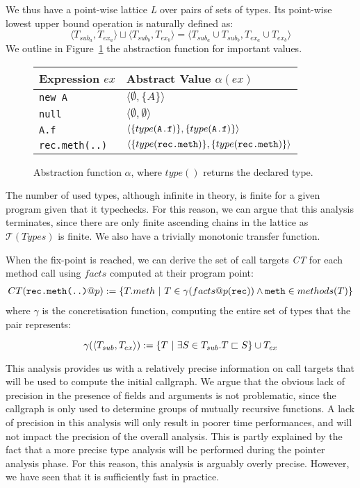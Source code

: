 We thus have a point-wise lattice \emph{L} over pairs of sets of types. Its
point-wise lowest upper bound operation is naturally defined as:
$$
    \langle T_{sub_a}, T_{ex_a} \rangle \sqcup  \langle T_{sub_b}, T_{ex_b} \rangle =  \langle T_{sub_a} \cup T_{sub_b}, T_{ex_a} \cup T_{ex_b} \rangle
$$
We outline in Figure~\ref{fig:ta:tf}
the abstraction function for important values.
\FloatBarrier
\begin{figure}[h]
    \centering

    \begin{tabular}{ l | l }
        Expression $ex$       & Abstract Value $\alpha(ex)$\\
        \hline
        \verb/new A/          & $\langle \emptyset, \{ A \} \rangle$ \\
        \verb/null/           & $\langle \emptyset, \emptyset \rangle$ \\
        \verb/A.f/            & $\langle\{type(\verb/A.f/)\}, \{type(\verb/A.f/)\} \rangle$ \\
        \verb/rec.meth(..)/   & $\langle\{type(\verb/rec.meth/)\}, \{type(\verb/rec.meth/)\} \rangle$ \\
    \end{tabular}

    \caption{Abstraction function $\alpha$, where $type()$ returns the declared
    type.}
    \label{fig:ta:tf}
\end{figure}

The number of used types, although infinite in theory, is finite for a given
program given that it typechecks. For this reason, we can argue that this
analysis terminates, since there are only finite ascending chains in the
lattice as $\mathcal{T}(Types)$ is finite. We also have a trivially monotonic
transfer function.

When the fix-point is reached, we can derive the set of call targets \emph{CT}
for each method call using $facts$ computed at their program point:
\begin{eqnarray*}
    CT(\verb/rec.meth(..)/ @ p) := \{ T.meth ~|~ T \in \gamma(facts@p(\verb/rec/)) \land \verb/meth/ \in methods(T) \}
\end{eqnarray*}
where $\gamma$ is the concretisation function, computing the entire set of
types that the pair represents:

$$
\gamma(\langle T_{sub}, T_{ex} \rangle ) := \{ T ~|~ \exists S \in T_{sub}. T \sqsubset S\} \cup T_{ex}
$$

This analysis provides us with a relatively precise information on call targets
that will be used to compute the initial callgraph. We argue that the obvious
lack of precision in the presence of fields and arguments is not problematic,
since the callgraph is only used to determine groups of mutually recursive
functions. A lack of precision in this analysis will only result in poorer time
performances, and will not impact the precision of the overall analysis. This
is partly explained by the fact that a more precise type analysis will be
performed during the pointer analysis phase. For this reason, this analysis is
arguably overly precise. However, we have seen that it is sufficiently fast in
practice.
